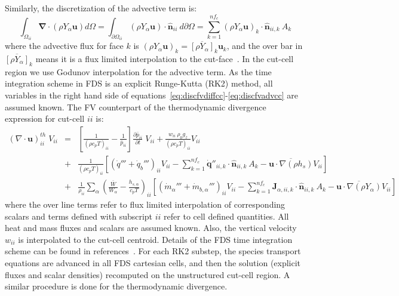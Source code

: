 \documentclass[journal,article,atmosphere,submit,moreauthors,pdftex]{Definitions/mdpi}
\begin{document}
Similarly, the discretization of the advective term is:
%
\begin{equation}
    \int_{\Omega_{ii}} { \boldsymbol{\nabla} \cdot  \left(  \rho Y_\alpha \mathbf{u} \right)} d \Omega =
     \int_{\partial \Omega_{ii}} { \left( \rho Y_\alpha \mathbf{u} \right) \cdot \hat{\mathbf{n}}_{ii} } \: d \partial \Omega =
     \sum^{nf_c}_{k=1} \left( \rho Y_\alpha \mathbf{u} \right)_k \cdot \hat{\mathbf{n}}_{ii,k} \: A_k \label{eq:discfvadvcc}
\end{equation}
%
where the advective flux for face $k$ is $\left( \rho Y_\alpha \mathbf{u} \right)_k = \overline{[\rho Y_\alpha]}_k \mathbf{u}_k$, and the over bar in $\overline{[\rho Y_\alpha]}_k$ means it is a flux limited interpolation to the cut-face~\cite{mcgratta_2013}. In the cut-cell region we use Godunov interpolation for the advective term. As the time integration scheme in FDS is an explicit Runge-Kutta (RK2) method, all variables in the right hand side of equations~\eqref{eq:discfvdiffcc}-\eqref{eq:discfvadvcc} are assumed known. The FV counterpart of the thermodynamic divergence expression for cut-cell $ii$ is:
%
%
\begin{eqnarray}
    ( \nabla \cdot \mathbf{u} )_{ii}^{th} \; V_{ii} &=&
    \left[ \frac{1}{(\rho c_p T)_{ii}} - \frac{1}{\bar{p}_{ii}} \right]
    \frac{\partial \bar{p}_{ii}}{\partial t} \; V_{ii} +
    \frac{w_{ii} \: \rho_0 g_z}{(\rho c_p T)_{ii}} V_{ii} \nonumber \\
    &+& \frac{1}{(\rho c_p T)_{ii}} \left[ (\dot{q}'''+ \dot{q}_b''')_{ii} V_{ii} -
    \sum_{k=1}^{nf_c} \dot{\mathbf{q}}''_{ii,k} \cdot \hat{\mathbf{n}}_{ii,k} \: A_k
    - \overline{\mathbf{u} \cdot \nabla (\rho h_s)} V_{ii} \right]  \\
    &+& \frac{1}{\rho_{ii}} \sum_\alpha \left( \frac{\overline{W}}{W_\alpha} - \frac{h_{s,\alpha}}{c_p T} \right)_{ii} \left[ (\dot{m}_\alpha'''+\dot{m}_{b,\alpha}''')_{ii} V_{ii} -
    \sum_{k=1}^{nf_c} \mathbf{J}_{\alpha,ii,k} \cdot \hat{\mathbf{n}}_{ii,k} \: A_k
    - \overline{\mathbf{u} \cdot \nabla (\rho Y_\alpha)} V_{ii} \right] \nonumber \label{eq:divth2}
\end{eqnarray}
%
where the over line terms refer to flux limited interpolation of corresponding scalars and terms defined with subscript $ii$ refer to cell defined quantities. All heat and mass fluxes and scalars are assumed known. Also, the vertical velocity $w_{ii}$ is interpolated to the cut-cell centroid. Details of the FDS time integration scheme can be found in references~\cite{mcgratta_2013,mcdermo_2014}. For each RK2 substep, the species transport equations are advanced in all FDS cartesian cells, and then the solution (explicit fluxes and scalar densities) recomputed on the unstructured cut-cell region. A similar procedure is done for the thermodynamic divergence. 
\end{document}
